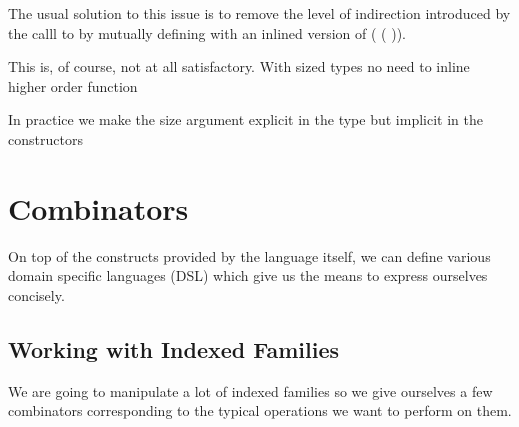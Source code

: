 
The usual solution to this issue is to remove the level of indirection introduced by
the calll to  by mutually defining with
 an inlined version of
( ( )).


This is, of course, not at all satisfactory.
With sized types no need to inline higher order function


In practice we make the size argument explicit in the type but implicit in the
constructors


\section{Combinators}

On top of the constructs provided by the language itself, we can define various
domain specific languages (DSL) which give us the means to express ourselves
concisely.

\subsection{Working with Indexed Families}
\label{indexed-combinators}

We are going to manipulate a lot of indexed families so we give ourselves a few
combinators corresponding to the typical operations we want to perform on them.

